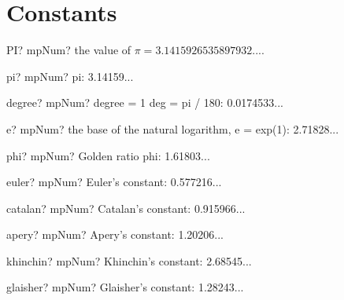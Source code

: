 \documentclass[12pt,a4paper,openany]{book}
\begin{document}
\section{Constants}

\begin{mpFunctionsExtract}
\mpWorksheetFunctionZero
{PI? mpNum? the value of $\pi = 3.1415926535897932...$.}
\end{mpFunctionsExtract}

\begin{mpFunctionsExtract}
\mpFunctionZero
{pi? mpNum?  pi: 3.14159...}
\end{mpFunctionsExtract}

\begin{mpFunctionsExtract}
\mpFunctionZero
{degree? mpNum?  degree = 1 deg = pi / 180: 0.0174533...}
\end{mpFunctionsExtract}

\begin{mpFunctionsExtract}
\mpFunctionZero
{e? mpNum?  the base of the natural logarithm, e = exp(1): 2.71828...}
\end{mpFunctionsExtract}

\begin{mpFunctionsExtract}
\mpFunctionZero
{phi? mpNum?  Golden ratio phi: 1.61803...}
\end{mpFunctionsExtract}

\begin{mpFunctionsExtract}
\mpFunctionZero
{euler? mpNum?  Euler's constant: 0.577216...}
\end{mpFunctionsExtract}

\begin{mpFunctionsExtract}
\mpFunctionZero
{catalan? mpNum?  Catalan's constant: 0.915966...}
\end{mpFunctionsExtract}

\begin{mpFunctionsExtract}
\mpFunctionZero
{apery? mpNum?  Apery's constant: 1.20206...}
\end{mpFunctionsExtract}

\begin{mpFunctionsExtract}
\mpFunctionZero
{khinchin? mpNum?  Khinchin's constant: 2.68545...}
\end{mpFunctionsExtract}

\begin{mpFunctionsExtract}
\mpFunctionZero
{glaisher? mpNum?  Glaisher's constant: 1.28243...}
\end{mpFunctionsExtract}
\end{document}
